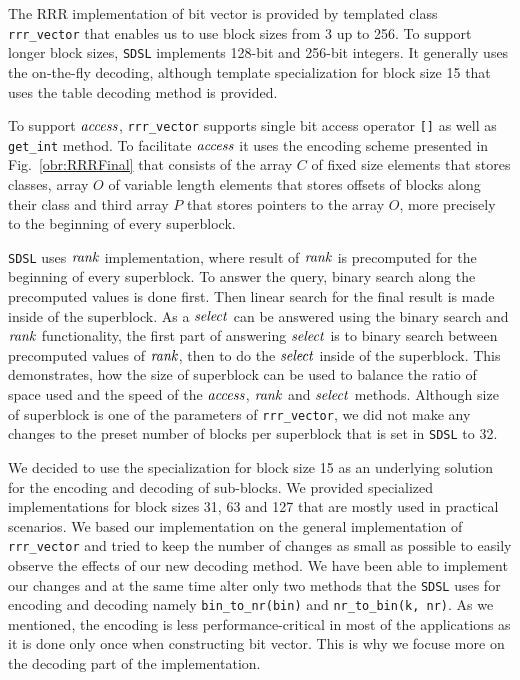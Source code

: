 The RRR implementation of bit vector is provided by templated class \texttt{rrr\_vector}
that enables us to use block sizes from 3 up to 256. To support longer block sizes,
\texttt{SDSL} implements 128-bit and 256-bit integers. It generally uses the on-the-fly decoding,
although template specialization for block size 15 that uses the table decoding method is provided.

To support $\mathit{access}$, \texttt{rrr\_vector} supports single bit access operator \texttt{[]} as well
as \texttt{get\_int} method. To facilitate $\mathit{access}$ it uses the encoding scheme presented in
Fig.~\ref{obr:RRRFinal} that consists of the array $C$ of fixed size elements that stores classes,
array $O$ of variable length elements that stores offsets of blocks along their class and third array
$P$ that stores pointers to the array $O$, more precisely to the beginning of every superblock.

\texttt{SDSL} uses $\mathit{rank}$ implementation, where result of $\mathit{rank}$ is precomputed for the beginning
of every superblock. To answer the query, binary search along the precomputed values is done first.
Then linear search for the final result is made inside of the superblock. As a $\mathit{select}$ can be answered
using the binary search and $\mathit{rank}$ functionality, the first part of answering $\mathit{select}$ is to binary
search between precomputed values of $\mathit{rank}$, then to do the $\mathit{select}$ inside of the superblock. This
demonstrates, how the size of superblock can be used to balance the ratio of space used and the speed
of the $\mathit{access}$, $\mathit{rank}$ and $\mathit{select}$ methods. Although size of superblock is one of the parameters
of \texttt{rrr\_vector}, we did not make any changes to the preset number of blocks per superblock that is
set in \texttt{SDSL} to 32.

We decided to use the specialization for block size 15 as an underlying solution for the encoding and
decoding of sub-blocks. We provided specialized implementations for block sizes 31, 63 and 127 that
are mostly used in practical scenarios. We based our implementation on the general implementation of
\texttt{rrr\_vector} and tried to keep the number of changes as small as possible to easily observe the
effects of our new decoding method. We have been able to implement our changes and at the same time alter
only two methods that the \texttt{SDSL} uses for encoding and decoding namely \texttt{bin\_to\_nr(bin)} and
\texttt{nr\_to\_bin(k, nr)}. As we mentioned, the encoding is less performance-critical in most of the
applications as it is done only once when constructing bit vector. This is why we focuse more on the decoding
part of the implementation.

